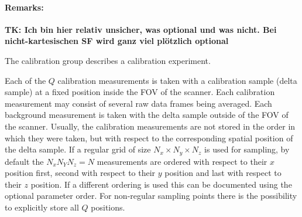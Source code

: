 \documentclass[landscape,a4paper]{article} %
\newcommand{\inlvar}[1]{{\ttfamily#1}}
\begin{document}
\begin{multicols}{2}
\paragraph{Remarks:}
\textbf{TK: Ich bin hier relativ unsicher, was optional und was nicht. Bei nicht-kartesischen SF wird ganz viel plötzlich optional}


The calibration group describes a calibration experiment.

Each of the $Q$ calibration measurements is taken with a calibration sample (delta sample) at a fixed position inside the FOV of the scanner. Each calibration measurement may consist of several raw data frames being averaged. Each background measurement is taken with the delta sample outside of the FOV of the scanner. Usually, the calibration measurements are not stored in the order in which they were taken, but with respect to the corresponding spatial position of the delta sample. If a regular grid of size $N_x \times N_y \times N_z$ is used for sampling, by default the $N_xN_YN_z = N$ measurements are ordered with respect to their $x$ position first, second with respect to their $y$ position and last with respect to their $z$ position. If a different ordering is used this can be documented using the optional parameter \inlvar{order}. For non-regular sampling points there is the possibility to explicitly store all $Q$ positions.
\end{multicols}
\end{document}
